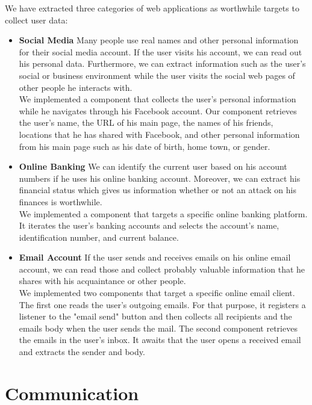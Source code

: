 	We have extracted three categories of web applications as worthwhile targets to collect user data:
	\begin{itemize}
		\item \textbf{Social Media} Many people use real names and other personal information for their social media account. If the user visits his account, we can read out his personal data. Furthermore, we can extract information such as the user's social or business environment while the user visits the social web pages of other people he interacts with. \\
		We implemented a component that collects the user's personal information while he navigates through his Facebook account. Our component retrieves the user's name, the URL of his main page, the names of his friends, locations that he has shared with Facebook, and other personal information from his main page such as his date of birth, home town, or gender.
		
		\item \textbf{Online Banking} We can identify the current user based on his account numbers if he uses his online banking account. Moreover, we can extract his financial status which gives us information whether or not an attack on his finances is worthwhile. \\
		We implemented a component that targets a specific online banking platform. It iterates the user's banking accounts and selects the account's name, identification number, and current balance.
		
		\item \textbf{Email Account} If the user sends and receives emails on his online email account, we can read those and collect probably valuable information that he shares with his acquaintance or other people. \\
		We implemented two components that target a specific online email client. The first one reads the user's outgoing emails. For that purpose, it registers a listener to the "email send" button and then collects all recipients and the emails body when the user sends the mail. The second component retrieves the emails in the user's inbox. It awaits that the user opens a received email and extracts the sender and body.
	\end{itemize}
	
\clearpage
\section{Communication}
\label{sec:communication}

